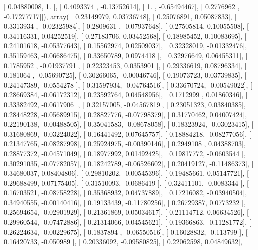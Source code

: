 \documentclass{article}
\begin{document}
       [ 0.04880008,  1.        ],
       [ 0.4093374 , -0.13752614],
       [ 1.        , -0.65494467],
       [ 0.2776962 , -0.17277717]]), array([[ 0.23149979,  0.03736748],
       [ 0.25076891,  0.05087833],
       [ 0.3313934 , -0.02325984],
       [ 0.2809631 , -0.07937648],
       [ 0.27505814,  0.10055508],
       [ 0.34116331,  0.04252519],
       [ 0.27183706,  0.03452568],
       [ 0.18985452,  0.10083695],
       [ 0.24101618, -0.05377643],
       [ 0.15562974,  0.02509037],
       [ 0.32328019, -0.01332476],
       [ 0.35159463, -0.06686475],
       [ 0.33650789,  0.0974418 ],
       [ 0.32976649,  0.06455311],
       [ 0.1785952 , -0.01937791],
       [ 0.22323453,  0.0353901 ],
       [ 0.29336619,  0.08796334],
       [ 0.181064  , -0.05690725],
       [ 0.30266065, -0.00046746],
       [ 0.19073723,  0.03739835],
       [ 0.24147389, -0.0554278 ],
       [ 0.31597934, -0.04764516],
       [ 0.33670724, -0.00549022],
       [ 0.28669384, -0.06172312],
       [ 0.23592764,  0.04548956],
       [ 0.1712999 ,  0.01860346],
       [ 0.33382492, -0.0617906 ],
       [ 0.32157005, -0.04567819],
       [ 0.23051323,  0.03840385],
       [ 0.28448228, -0.05689915],
       [ 0.28827776, -0.07798379],
       [ 0.31770462,  0.04007424],
       [ 0.22190138, -0.00488505],
       [ 0.35041583, -0.08678058],
       [ 0.18323924, -0.03023415],
       [ 0.31680869, -0.03224022],
       [ 0.16441492,  0.07645757],
       [ 0.18884218, -0.08277056],
       [ 0.21347765, -0.08287998],
       [ 0.25924975, -0.00390146],
       [ 0.2949108 ,  0.04388703],
       [ 0.28877372, -0.04571049],
       [ 0.18977992,  0.01492425],
       [ 0.19817772, -0.0603544 ],
       [ 0.30291035, -0.07782057],
       [ 0.18242789, -0.06526602],
       [ 0.20419127, -0.11486373],
       [ 0.34680037,  0.08404806],
       [ 0.29810202, -0.00545396],
       [ 0.19485661,  0.05147721],
       [ 0.29688499,  0.07175405],
       [ 0.31510093, -0.0686419 ],
       [ 0.32411101, -0.0083344 ],
       [ 0.16703521, -0.08758228],
       [ 0.35368932,  0.04737889],
       [ 0.17216082, -0.03940504],
       [ 0.34940555, -0.00140416],
       [ 0.19133439, -0.11780256],
       [ 0.26729387,  0.0773232 ],
       [ 0.25694654, -0.02901929],
       [ 0.21361869,  0.05034617],
       [ 0.21114712,  0.06634526],
       [ 0.29960544, -0.07472886],
       [ 0.21314066,  0.04545621],
       [ 0.19366863, -0.11281772],
       [ 0.26224634, -0.00229675],
       [ 0.1837894 , -0.06550516],
       [ 0.16028832, -0.113799  ],
       [ 0.16420733, -0.050989  ],
       [ 0.20336092, -0.09580825],
       [ 0.22062598,  0.04849632],
\end{document}
